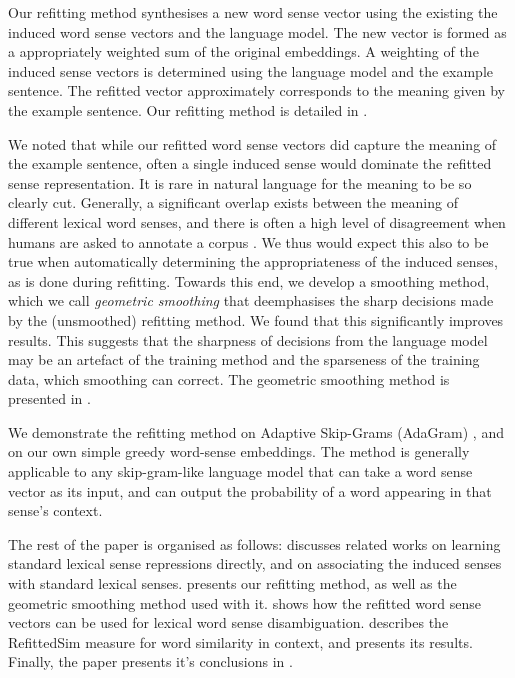 \documentclass{sig-alternate}
\begin{document}
Our refitting method synthesises a new word sense vector using the existing the induced word sense vectors and the language model.
The new vector is formed as a appropriately weighted sum of the original embeddings. A weighting of the induced sense vectors is determined using the language model and the example sentence.
The refitted vector approximately corresponds to the meaning given by the example sentence. 
Our refitting method is detailed in .

We noted that while our refitted word sense vectors did capture the meaning of the example sentence, often a single induced sense would dominate the refitted sense representation. It is rare in natural language for the meaning to be so clearly cut. Generally, a significant overlap exists between the meaning of different lexical word senses, and there is often a high level of disagreement when humans are asked to annotate a corpus \parencite{veronis1998study}. We thus would expect this also to be true when automatically determining the appropriateness of the induced senses, as is done during refitting. Towards this end, we develop a smoothing method, which we call \emph{geometric smoothing} that deemphasises the sharp decisions made by the (unsmoothed) refitting method. We found that this significantly improves results. This suggests that the sharpness of decisions from the language model may be an artefact of the training method and the sparseness of the training data, which smoothing can correct. The geometric smoothing method is presented in .


We demonstrate the refitting method on Adaptive Skip-Grams (AdaGram) \parencite{AdaGrams}, and on our own simple greedy word-sense embeddings. The method is generally applicable to any skip-gram-like language model that can take a word sense vector as its input, and can output the probability of a word appearing in that sense's context.


The rest of the paper is organised as follows:  discusses related works on learning standard lexical sense repressions directly, and on associating the induced senses with standard lexical senses.  presents our refitting method, as well as the geometric smoothing method used with it.  shows how the refitted word sense vectors can be used for lexical word sense disambiguation.  describes the RefittedSim measure for word similarity in context, and presents its results. Finally, the paper presents it's conclusions in .
\end{document}
